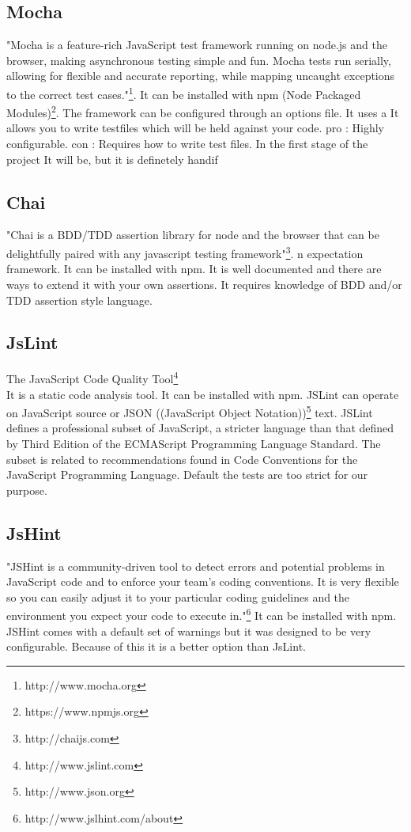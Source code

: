 \documentclass{article}
\begin{document}
\subsection{Mocha}
"Mocha is a feature-rich JavaScript test framework running on node.js and the browser, making asynchronous testing simple and fun.
Mocha tests run serially, allowing for flexible and accurate reporting, while mapping uncaught exceptions to the correct test cases."\footnote{http://www.mocha.org}.
It can be installed with npm (Node Packaged Modules)\footnote{https://www.npmjs.org}.
The framework can be configured through an options file.
It uses a It allows you to write testfiles which will be held against your code.
pro : Highly configurable.
con : Requires how to write test files. 
In the first stage of the project It will be, but it is definetely handif

\subsection{Chai}
"Chai is a BDD/TDD assertion library for node and the browser that can be delightfully paired with any javascript testing framework"\footnote{http://chaijs.com}.
n expectation framework. It can be installed with npm.
It is well documented and there are ways to extend it with your own assertions.
It requires knowledge of BDD and/or TDD assertion style language.

\subsection{JsLint}
The JavaScript Code Quality Tool\footnote{http://www.jslint.com}\\
It is a static code analysis tool.
It can be installed with npm.
JSLint can operate on JavaScript source or JSON ((JavaScript Object Notation))\footnote {http://www.json.org} text.
JSLint defines a professional subset of JavaScript, a stricter language than that defined by Third Edition of the ECMAScript Programming Language Standard.
The subset is related to recommendations found in Code Conventions for the JavaScript Programming Language.
Default the tests are too strict for our purpose.

\subsection{JsHint}
"JSHint is a community-driven tool to detect errors and potential problems in JavaScript code and to enforce your team's coding conventions. It is very flexible so you can easily adjust it to your particular coding guidelines and the environment you expect your code to execute in."\footnote{http://www.jslhint.com/about}
It can be installed with npm.
JSHint comes with a default set of warnings but it was designed to be very configurable.
Because of this it is a better option than JsLint.
\end{document}
